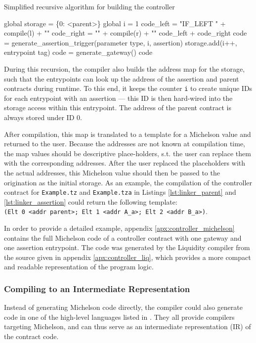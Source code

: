 \begin{algorithm}
\caption{Simplified recursive algorithm for building the controller}\label{alg:compile_manager}
	\begin{algorithmic}[1]
	\State global storage = \{0: <parent>\}
	\State global i = 1
	\State code\_left = "IF\_LEFT {" + compile(l) + "}"
	\State code\_right = "{" + compile(r) + "}"
	\State \Return code\_left + code\_right
	\Else
	\State code = generate\_assertion\_trigger(parameter type, i, assertion)
	\State storage.add(i++, entrypoint tag)
	\Else
	\State code = generate\_gateway()
	\EndIf
	\State \Return code
	\EndIf
	\EndFunction
	\end{algorithmic}
\end{algorithm}

During this recursion, the compiler also builds the address map for the storage, such that the entrypoints can look up the address of the assertion and parent contracts during runtime. To this end, it keeps the counter \texttt{i} to create unique IDs for each entrypoint with an assertion --- this ID is then hard-wired into the storage access within this entrypoint. The address of the parent contract is always stored under ID 0. 

After compilation, this map is translated to a template for a Michelson value and returned to the user. Because the addresses are not known at compilation time, the map values should be descriptive place-holders, s.t. the user can replace them with the corresponding addresses. After the user replaced the placeholders with the actual addresses, this Michelson value should then be passed to the origination as the initial storage. As an example, the compilation of the controller contract for \texttt{Example.tz} and \texttt{Example.tza} in Listings \ref{lst:linker_parent} and \ref{lst:linker_assertion} could return the following template:\\ \texttt{(Elt 0 <addr parent>; Elt 1 <addr A\_a>; Elt 2 <addr B\_a>)}.

In order to provide a detailed example, appendix \ref{apx:controller_michelson} contains the full Michelson code of a controller contract with one gateway and one assertion entrypoint. The code was generated by the Liquidity compiler from the source given in appendix \ref{apx:controller_liq}, which provides a more compact and readable representation of the program logic.

\subsubsection{Compiling to an Intermediate Representation}\label{sec:IR}
Instead of generating Michelson code directly, the compiler could also generate code in one of the high-level languages listed in . They all provide compilers targeting Michelson, and can thus serve as an intermediate representation (IR) of the contract code.

